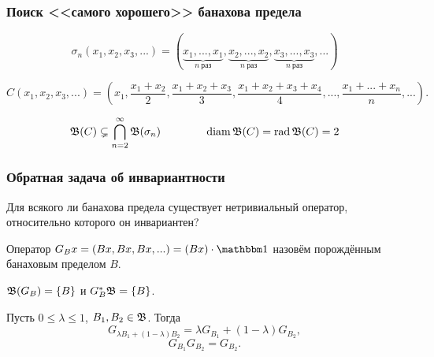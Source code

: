 \begin{frame}\frametitle{Поиск <<самого хорошего>> банахова предела}
	\begin{equation}
		\sigma_n (x_1, x_2, x_3, ...) = (
		\underbrace{x_1,...,x_1}_{n~\text{раз}},
		\underbrace{x_2,...,x_2}_{n~\text{раз}},
		\underbrace{x_3,...,x_3}_{n~\text{раз}},
		...)
	\end{equation}

	\begin{equation}
		C (x_1, x_2, x_3, ...) = \left(
		x_1,
		\dfrac{x_1+x_2}2,
		\dfrac{x_1+x_2 + x_3}3,
		\dfrac{x_1+x_2+x_3+x_4}4,
		...,
		\dfrac{x_1+...+x_n}n,
		...\right)
		.
	\end{equation}

	\begin{equation}
		\mathfrak{B}(C) \subsetneq \bigcap_{n=2}^\infty \mathfrak{B}(\sigma_n)
		\qquad
		\qquad
		\operatorname{diam}\mathfrak{B}(C) = \operatorname{rad} \mathfrak{B}(C) = 2
	\end{equation}
\end{frame}


\begin{frame}\frametitle{{Обратная задача об инвариантности}}
	Для всякого ли банахова предела существует нетривиальный оператор, относительно которого он инвариантен?
	\vfill
	\begin{ddefinition}
		Оператор $G_B x = (Bx, Bx, Bx, ...) = (Bx)\cdot\one$
		назовём порождённым банаховым пределом $B$.
	\end{ddefinition}
	\vfill
	\begin{ttheorem}
		$\mathfrak{B}(G_B) = \{B\}$ и $G_B^* \mathfrak{B} = \{B\}$.
	\end{ttheorem}
	\vfill
	\begin{llemma}
		Пусть $0 \leq \lambda \leq 1$, $B_1, B_2 \in \mathfrak{B}$.
		Тогда
		\begin{equation}
			G_{\lambda B_1+(1-\lambda) B_2} =\lambda G_{B_1} + (1-\lambda)G_{B_2}
			,
		\end{equation}
		\begin{equation}
			G_{B_1} G_{B_2} = G_{B_2}
			.
		\end{equation}
	\end{llemma}
\end{frame}


